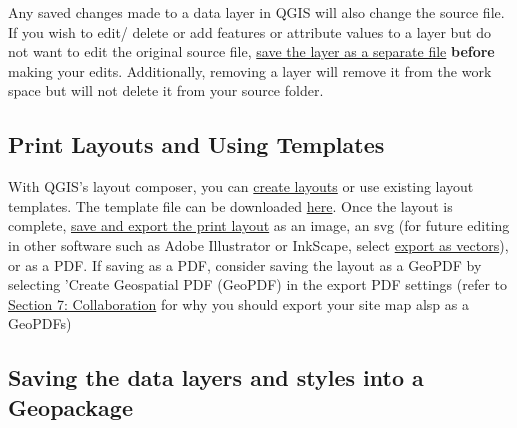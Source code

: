 \documentclass[
  a4paper,
  onecolumn,
  oneside]{book}
\begin{document}
\begin{tcolorbox}[enhanced jigsaw, opacitybacktitle=0.6, colbacktitle=quarto-callout-warning-color!10!white, breakable, coltitle=black, title=\textcolor{quarto-callout-warning-color}{\faExclamationTriangle}\hspace{0.5em}{Warning}, toprule=.15mm, bottomrule=.15mm, colback=white, left=2mm, toptitle=1mm, bottomtitle=1mm, arc=.35mm, colframe=quarto-callout-warning-color-frame, titlerule=0mm, opacityback=0, rightrule=.15mm, leftrule=.75mm]

Any saved changes made to a data layer in QGIS will also change the
source file. If you wish to edit/ delete or add features or attribute
values to a layer but do not want to edit the original source file,
\href{https://docs.qgis.org/2.8/en/docs/user_manual/working_with_vector/editing_geometry_attributes.html\#digitizing-an-existing-layer}{save
the layer as a separate file} \textbf{before} making your edits.
Additionally, removing a layer will remove it from the work space but
will not delete it from your source folder.

\end{tcolorbox}

\hypertarget{print-layouts-and-using-templates}{%
\subsection{Print Layouts and Using
Templates}\label{print-layouts-and-using-templates}}

With QGIS's layout composer, you can
\href{https://docs.qgis.org/3.22/en/docs/user_manual/print_composer/overview_composer.html\#the-layout-manager}{create
layouts} or use existing layout templates. The template file can be
downloaded \href{add\%20link}{here}. Once the layout is complete,
\href{https://docs.qgis.org/3.22/en/docs/user_manual/print_composer/create_output.html}{save
and export the print layout} as an image, an svg (for future editing in
other software such as Adobe Illustrator or InkScape, select
\href{https://docs.qgis.org/3.22/en/docs/user_manual/print_composer/overview_composer.html\#layout-export-settings}{export
as vectors}), or as a PDF. If saving as a PDF, consider saving the
layout as a GeoPDF by selecting 'Create Geospatial PDF (GeoPDF) in the
export PDF settings (refer to
\href{https://sitemapping.guide/part3/collaboration.html}{Section 7:
Collaboration} for why you should export your site map alsp as a
GeoPDFs)

\hypertarget{saving-the-data-layers-and-styles-into-a-geopackage}{%
\subsection{Saving the data layers and styles into a
Geopackage}\label{saving-the-data-layers-and-styles-into-a-geopackage}}
\end{document}
